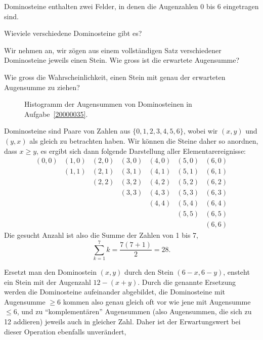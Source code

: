Dominosteine enthalten zwei Felder, in denen die Augenzahlen
0 bis 6 eingetragen sind.
\begin{teilaufgaben}
\item Wieviele verschiedene Dominosteine gibt es?
\item Wir nehmen an, wir zögen aus einem vollständigen Satz verschiedener
Dominosteine jeweils einen Stein.
Wie gross ist die erwartete Augensumme?
\item
Wie gross die Wahrscheinlichkeit, einen Stein mit genau der
erwarteten Augensumme zu ziehen?
\end{teilaufgaben}

\begin{loesung}
\begin{figure}
\centering
{}
\caption{Histogramm der Augensummen von Dominosteinen in Aufgabe~\ref{20000035}.
\label{20000035:histogram}}
\end{figure}
\begin{teilaufgaben}
\item Dominosteine sind Paare von Zahlen aus $\{0,1,2,3,4,5,6\}$, wobei
wir $(x,y)$ und $(y,x)$ als gleich zu betrachten haben. Wir können die
Steine daher so anordnen, dass $x\ge y$, es ergibt sich dann folgende
Darstellung aller Elementarereignisse:
\[
\begin{matrix}
(0,0)&(1,0)&(2,0)&(3,0)&(4,0)&(5,0)&(6,0)\\
     &(1,1)&(2,1)&(3,1)&(4,1)&(5,1)&(6,1)\\
     &     &(2,2)&(3,2)&(4,2)&(5,2)&(6,2)\\
     &     &     &(3,3)&(4,3)&(5,3)&(6,3)\\
     &     &     &     &(4,4)&(5,4)&(6,4)\\
     &     &     &     &     &(5,5)&(6,5)\\
     &     &     &     &     &     &(6,6)
\end{matrix}
\]
Die gesucht Anzahl ist also die Summe der Zahlen von 1 bis 7,
\[
\sum_{k=1}^7k=\frac{7(7+1)}2=28.
\]
\item Ersetzt man den Dominostein $(x,y)$ durch den Stein $(6-x,6-y)$,
ensteht ein Stein mit der Augenzahl $12-(x+y)$. Durch die genannte
Ersetzung werden die Dominosteine aufeinander abgebildet, die Dominosteine
mit Augensumme $\ge6$ kommen also genau gleich oft vor wie jene mit
Augensumme $\le6$, und zu ``komplementären'' Augensummen (also Augensummen,
die sich zu 12 addieren) jeweils auch in gleicher Zahl. Daher ist
der Erwartungswert bei dieser Operation ebenfalls unverändert,

\end{teilaufgaben}
\end{loesung}
